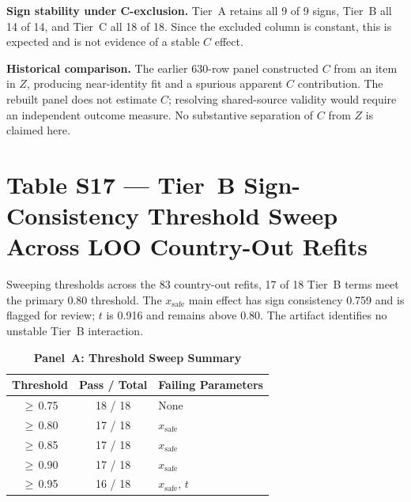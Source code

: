 \documentclass[11pt]{article}
\begin{document}
\noindent\justifying
\textbf{Sign stability under C-exclusion.} Tier~A retains all 9 of 9 signs, Tier~B all 14 of 14, and Tier~C all 18 of 18. Since the excluded column is constant, this is expected and is not evidence of a stable $C$ effect.

\noindent\justifying
\textbf{Historical comparison.} The earlier 630-row panel constructed $C$ from an item in $Z$, producing near-identity fit and a spurious apparent $C$ contribution. The rebuilt panel does not estimate $C$; resolving shared-source validity would require an independent outcome measure. No substantive separation of $C$ from $Z$ is claimed here.

\section*{Table S17 --- Tier~B Sign-Consistency Threshold Sweep Across LOO Country-Out Refits}

\noindent\justifying
Sweeping thresholds across the 83 country-out refits, 17 of 18 Tier~B terms meet the primary 0.80 threshold. The $x_{\text{safe}}$ main effect has sign consistency 0.759 and is flagged for review; $t$ is 0.916 and remains above 0.80. The artifact identifies no unstable Tier~B interaction.

\begin{table}[!htbp]
\centering
\small
\caption*{\textbf{Panel~A: Threshold Sweep Summary}}
\begin{tabular}{ccl}
\toprule
Threshold & Pass / Total & Failing Parameters \\
\midrule
$\geq$\,0.75 & 18 / 18 & None \\
$\geq$\,0.80 & 17 / 18 & $x_{\text{safe}}$ \\
$\geq$\,0.85 & 17 / 18 & $x_{\text{safe}}$ \\
$\geq$\,0.90 & 17 / 18 & $x_{\text{safe}}$ \\
$\geq$\,0.95 & 16 / 18 & $x_{\text{safe}}$, $t$ \\
\bottomrule
\end{tabular}
\end{table}
\end{document}
